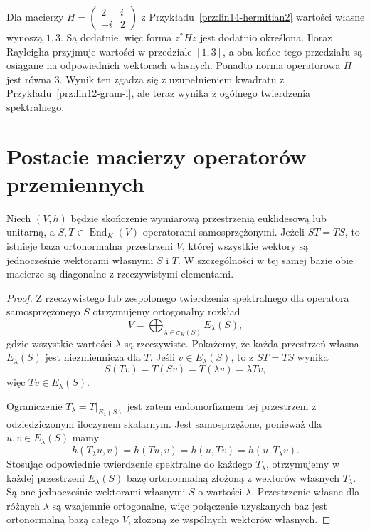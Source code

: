 \begin{przyklad}
\label{prz:lin14-hermitian-positive}
Dla macierzy
\(H=\begin{pmatrix}2&i\\-i&2\end{pmatrix}\)
z Przykładu~\ref{prz:lin14-hermitian2}
wartości własne wynoszą \(1,3\).
Są dodatnie, więc
forma \(z^*Hz\) jest
dodatnio określona.
Iloraz Rayleigha
przyjmuje wartości w
przedziale \([1,3]\),
a oba końce tego przedziału
są osiągane na odpowiednich
wektorach własnych.
Ponadto norma operatorowa
\(H\) jest równa \(3\).
Wynik ten zgadza się z
uzupełnieniem kwadratu
z Przykładu~\ref{prz:lin12-gram-i},
ale teraz wynika z
ogólnego twierdzenia spektralnego.
\end{przyklad}

\section{Postacie macierzy operatorów przemiennych}
\label{sec:lin14-commuting}

\begin{twierdzenie}
\label{thm:lin14-simultaneous}
Niech \((V,h)\) będzie
skończenie wymiarową
przestrzenią euklidesową
lub unitarną,
a \(S,T\in\operatorname{End}_K(V)\)
operatorami samosprzężonymi.
Jeżeli \(ST=TS\),
to istnieje baza
ortonormalna przestrzeni \(V\), której
wszystkie wektory są
jednocześnie wektorami
własnymi \(S\) i \(T\).
W szczególności w tej samej
bazie obie macierze są diagonalne
z rzeczywistymi elementami.
\end{twierdzenie}
\begin{proof}
Z rzeczywistego lub
zespolonego twierdzenia spektralnego
dla operatora samosprzężonego \(S\)
otrzymujemy ortogonalny rozkład
\[
 V=\bigoplus_{\lambda\in\sigma_K(S)}
                     E_\lambda(S),
\]
gdzie wszystkie wartości
\(\lambda\) są rzeczywiste.
Pokażemy, że każda przestrzeń
własna \(E_\lambda(S)\)
jest niezmiennicza dla \(T\).
Jeśli \(v\in E_\lambda(S)\),
to z \(ST=TS\) wynika
\[
 S(Tv)=T(Sv)=T(\lambda v)=\lambda Tv,
\]
więc \(Tv\in E_\lambda(S)\).

Ograniczenie
\(T_\lambda=T|_{E_\lambda(S)}\)
jest zatem endomorfizmem
tej przestrzeni z odziedziczonym
iloczynem skalarnym.
Jest samosprzężone, ponieważ
dla \(u,v\in E_\lambda(S)\)
mamy
\[
 h(T_\lambda u,v)=h(Tu,v)
 =h(u,Tv)=h(u,T_\lambda v).
\]
Stosując odpowiednie
twierdzenie spektralne
do każdego \(T_\lambda\),
otrzymujemy w każdej
przestrzeni \(E_\lambda(S)\)
bazę ortonormalną złożoną
z wektorów własnych \(T_\lambda\).
Są one jednocześnie
wektorami własnymi \(S\)
o wartości \(\lambda\).
Przestrzenie własne dla
różnych \(\lambda\) są wzajemnie
ortogonalne, więc połączenie
uzyskanych baz jest
ortonormalną bazą całego \(V\),
złożoną ze wspólnych
wektorów własnych.
\end{proof}

